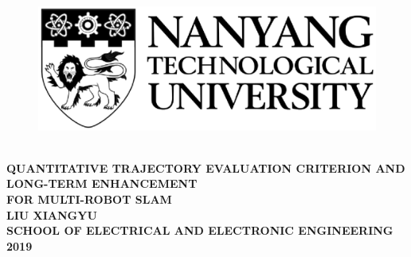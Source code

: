 \begin{titlepage}

\begin{figure}[H]
\centering
\includegraphics[scale=0.8]{Title/logo.eps}
\caption*{}
\label{fig:entropy} 
\end{figure}

\centering

~\\[0.4in]

{\selectfont
	\uppercase{\textbf{\large{Quantitative Trajectory Evaluation Criterion and Long-term Enhancement\\ for Multi-Robot SLAM}\\[2in]
\normalsize	{Liu Xiangyu\\
SCHOOL OF ELECTRICAL AND ELECTRONIC ENGINEERING\\
2019}}}}

\newpage
\end{titlepage}